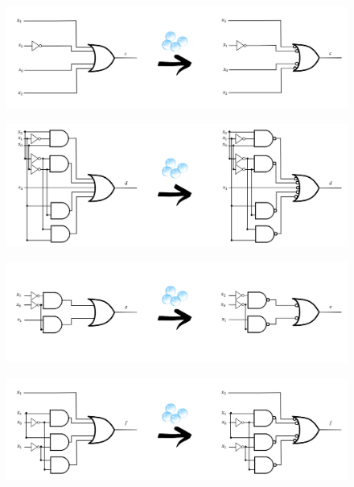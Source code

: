 \documentclass{article}
\begin{document}
\begin{figure}[hp]
\centering
\includegraphics[scale=0.25]{c-transformation}
\end{figure}

\begin{figure}[hp]
\centering
\includegraphics[scale=0.25]{d-transformation}
\end{figure}

\begin{figure}[hp]
\centering
\includegraphics[scale=0.25]{e-transformation}
\end{figure}

\begin{figure}[hp]
\centering
\includegraphics[scale=0.25]{f-transformation}
\end{figure}
\end{document}
